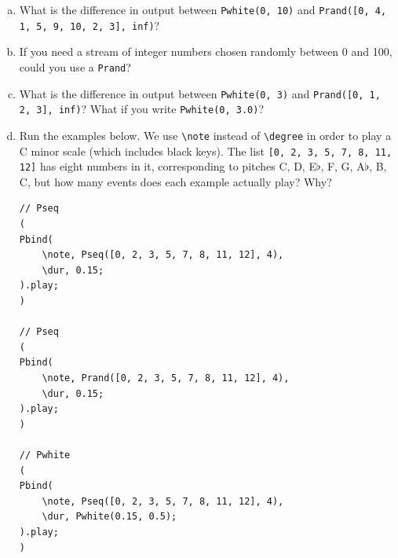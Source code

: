 \begin{enumerate}[a)]
\item What is the difference in output between \texttt{Pwhite(0, 10)} and \texttt{Prand([0, 4, 1, 5, 9, 10, 2, 3], inf)}?

\item If you need a stream of integer numbers chosen randomly between 0 and 100, could you use a \texttt{Prand}?

\item What is the difference in output between \texttt{Pwhite(0, 3)} and \texttt{Prand([0, 1, 2, 3], inf)}? What if you write \texttt{Pwhite(0, 3.0)}?

\item  Run the examples below. We use \texttt{\textbackslash note} instead of \texttt{\textbackslash degree} in order to play a C minor scale (which includes black keys). The list \texttt{[0, 2, 3, 5, 7, 8, 11, 12]} has eight numbers in it, corresponding to pitches C, D, E$\flat$, F, G, A$\flat$, B, C, but how many events does each example actually play? Why?

 
\begin{lstlisting}[style=SuperCollider-IDE, basicstyle=\scttfamily\footnotesize]
// Pseq
(
Pbind(
	\note, Pseq([0, 2, 3, 5, 7, 8, 11, 12], 4),
	\dur, 0.15;
).play;
)

// Pseq
(
Pbind(
	\note, Prand([0, 2, 3, 5, 7, 8, 11, 12], 4),
	\dur, 0.15;
).play;
)

// Pwhite
(
Pbind(
	\note, Pseq([0, 2, 3, 5, 7, 8, 11, 12], 4),
	\dur, Pwhite(0.15, 0.5);
).play;
)
\end{lstlisting}

\end{enumerate}



